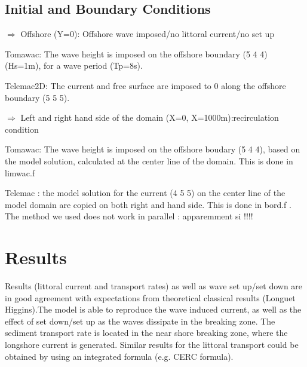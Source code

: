 %
%
\subsection{Initial and Boundary Conditions}
%
$\Rightarrow $ Offshore (Y=0): Offshore wave imposed/no littoral current/no set up 

Tomawac:
The wave height is imposed on the offshore boundary (5 4 4) (Hs=1m), for a wave period (Tp=8s).

Telemac2D:
The current and free surface are imposed to 0 along the offshore boundary (5 5 5).

$\Rightarrow $ Left and right hand side of the domain (X=0, X=1000m):recirculation condition 

Tomawac:
The wave height is imposed on the offshore boudary (5 4 4), based on the model solution, calculated  at the center line of the domain.  This is done in limwac.f 

Telemac :
the model solution for the current (4 5 5) on the center line of the model domain are copied on both right and hand side. This is done in bord.f . The method we used does not work in parallel : apparemment si !!!!

%
%
%
%

%
%
\section{Results}
%
Results (littoral current and transport rates) as well as wave set up/set down are in good agreement with
expectations from theoretical classical results (Longuet Higgins).The model is able to reproduce the wave
induced current, as well as the effect of set down/set up as the waves dissipate in the breaking zone.
The sediment transport rate is located in the near shore breaking zone, where the longshore current is
generated.
Similar results for the littoral transport could be obtained by using an integrated formula (e.g. CERC formula).

